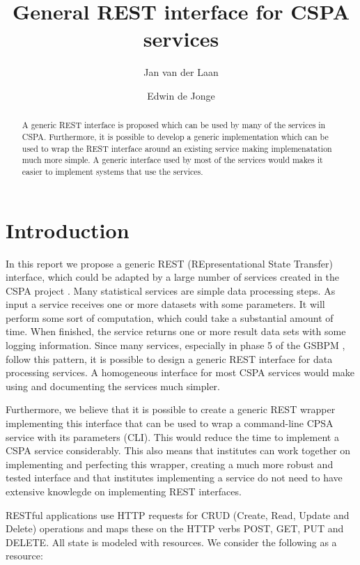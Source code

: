 \documentclass[a4paper]{article}
\title{General REST interface for CSPA services}
\author{Jan van der Laan \and Edwin de Jonge}
\begin{document}
\maketitle

\begin{abstract}
A generic REST interface is proposed which can be used by many of the services
in CSPA. Furthermore, it is possible to develop a generic implementation which
can be used to wrap the REST interface around an existing service making
implemenatation much more simple. A generic interface used by most of the
services would makes it easier to implement systems that use the services.
\end{abstract}

\section{Introduction}

In this report we propose a generic REST (REpresentational State Transfer)
interface, which could be adapted by a large number of services created in the
CSPA project \citep{cspa2013}. Many statistical services are simple data
processing steps. As input a service receives one or more datasets with some
parameters. It will perform some sort of computation, which could take a
substantial amount of time.  When finished, the service returns one or more
result data sets with some logging information.  Since many services, especially
in phase 5 of the GSBPM \citep{gsbpm2013}, follow this
pattern, it is possible to design a generic REST interface for data processing
services.  A homogeneous interface for most CSPA services would make using and
documenting the services much simpler. 

Furthermore, we believe that it is possible to create a generic REST wrapper
implementing this interface that can be used to wrap a command-line CPSA service
with its parameters (CLI). This would reduce the time to implement a CSPA
service considerably.  This also means that institutes can work together on
implementing and perfecting this wrapper, creating a much more robust and tested
interface and that institutes implementing a service do not need to have
extensive knowlegde on implementing REST interfaces. 

RESTful applications use HTTP requests for CRUD (Create, Read, Update and
Delete) operations and maps these on the HTTP verbs POST, GET, PUT and DELETE.
All state is modeled with resources. We consider the following as a resource:
\end{document}
